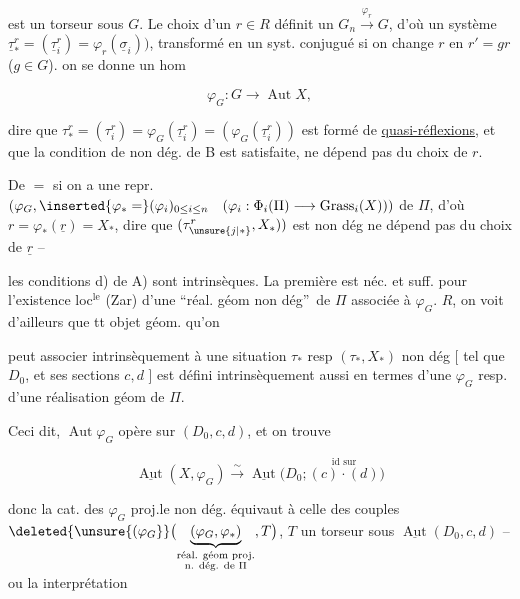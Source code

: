 
est un torseur sous $G$. Le choix d'un $r\in R$ définit un  $G_n\xrightarrow{\varphi_r}G$, d'où un système  $\underline\tau_*^r=(\underline\tau_i^r)=\varphi_r(\underline\sigma_i))$, transformé en un syst. conjugué  si on change $r$ en $r'=gr$ ($g\in G$).  on se donne un hom

\[
\varphi_G:G\longrightarrow\operatorname{Aut}X,
\]

dire que $\tau_*^r=(\tau_i^r)=\varphi_G(\underline\tau_i^r)=(\varphi_G(\underline\tau_i^r))$ est formé de \uline{quasi-réflexions}, et que la condition de non dég. de B est satisfaite, ne dépend pas du choix de $r$.

De $=$ si on a une repr.  $(\varphi_G,\inserted{\varphi_*=}(\varphi_i)_{0\leq i\leq n}\quad(\varphi_i:\Phi_i(\Pi)\longrightarrow\operatorname{Grass}_i(X)))$ de $\Pi$, d'où $r=\varphi_*(\underline r)=X_*$, dire que $(\tau_{\unsure{j|*}}^r,X_*))$  est non dég ne dépend pas du choix de $\underline r$ --  

les conditions  d) de A) sont intrinsèques. La première est  néc. et suff. pour l'existence loc$^{\mathrm{le}}$ (Zar) d'une \textquotedblleft réal. géom non dég\textquotedblright\ de $\Pi$ associée à $\varphi_G$.   $R$, on voit d'ailleurs que tt objet géom. qu'on

peut associer intrinsèquement à une situation $\tau_*$ resp $(\tau_*,X_*)$ non dég [ tel que $D_0$, et ses sections $c,d$ ] est défini intrinsèquement aussi en termes d'une  $\varphi_G$  resp. d'une \deleted{\unsure{$\varphi$}} réalisation géom  de $\Pi$.

Ceci dit, $\operatorname{Aut}\varphi_G$ opère sur $(D_0,c,d)$, et on trouve

\[
\underline{\operatorname{Aut}}(X,\varphi_G)\xrightarrow{\sim}
\underline{\operatorname{Aut}}\bigl(D_0;\overset{\text{id sur}}{(c)\cdot(d)}\bigr)
\]

donc la cat. des $\varphi_G$ proj.le non dég. équivaut à celle des couples $\deleted{\unsure{(\varphi_G}}\bigl(\underbrace{(\varphi_G,\varphi_*)}_{\substack{\text{réal. géom proj.}\\\text{n. dég. de }\Pi}},T\bigr)$, $T$ un torseur sous $\underline{\operatorname{Aut}}(D_0,c,d)$ -- ou la  interprétation


